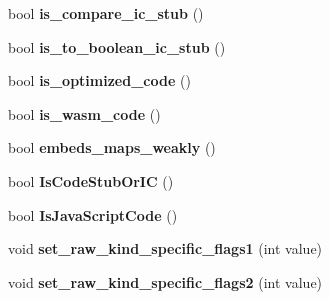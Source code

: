 \begin{DoxyCompactItemize}
\item 
bool {\bfseries is\+\_\+compare\+\_\+ic\+\_\+stub} ()\hypertarget{classv8_1_1internal_1_1_code_a2f486b0f8fd557b581527f930a32dfdd}{}\label{classv8_1_1internal_1_1_code_a2f486b0f8fd557b581527f930a32dfdd}

\item 
bool {\bfseries is\+\_\+to\+\_\+boolean\+\_\+ic\+\_\+stub} ()\hypertarget{classv8_1_1internal_1_1_code_aca10ecba49409b4f28a951138dc24458}{}\label{classv8_1_1internal_1_1_code_aca10ecba49409b4f28a951138dc24458}

\item 
bool {\bfseries is\+\_\+optimized\+\_\+code} ()\hypertarget{classv8_1_1internal_1_1_code_ab4ca5e08abbe160aef3eb3bebddc16b8}{}\label{classv8_1_1internal_1_1_code_ab4ca5e08abbe160aef3eb3bebddc16b8}

\item 
bool {\bfseries is\+\_\+wasm\+\_\+code} ()\hypertarget{classv8_1_1internal_1_1_code_a5dd20b70cafbc08a5a9eceb43a3a56b8}{}\label{classv8_1_1internal_1_1_code_a5dd20b70cafbc08a5a9eceb43a3a56b8}

\item 
bool {\bfseries embeds\+\_\+maps\+\_\+weakly} ()\hypertarget{classv8_1_1internal_1_1_code_a33a754fb6ea049243f8ae39b8b91bfca}{}\label{classv8_1_1internal_1_1_code_a33a754fb6ea049243f8ae39b8b91bfca}

\item 
bool {\bfseries Is\+Code\+Stub\+Or\+IC} ()\hypertarget{classv8_1_1internal_1_1_code_a1c2f8f4399bbbc5c12e66d5a6276619c}{}\label{classv8_1_1internal_1_1_code_a1c2f8f4399bbbc5c12e66d5a6276619c}

\item 
bool {\bfseries Is\+Java\+Script\+Code} ()\hypertarget{classv8_1_1internal_1_1_code_a32e377f225d8d5cbd12361f2229a7d53}{}\label{classv8_1_1internal_1_1_code_a32e377f225d8d5cbd12361f2229a7d53}

\item 
void {\bfseries set\+\_\+raw\+\_\+kind\+\_\+specific\+\_\+flags1} (int value)\hypertarget{classv8_1_1internal_1_1_code_a1cfaa27bb25be863d031725ca5449556}{}\label{classv8_1_1internal_1_1_code_a1cfaa27bb25be863d031725ca5449556}

\item 
void {\bfseries set\+\_\+raw\+\_\+kind\+\_\+specific\+\_\+flags2} (int value)\hypertarget{classv8_1_1internal_1_1_code_adf467d7a944656df2f95b6489badab52}{}\label{classv8_1_1internal_1_1_code_adf467d7a944656df2f95b6489badab52}


\end{DoxyCompactItemize}
